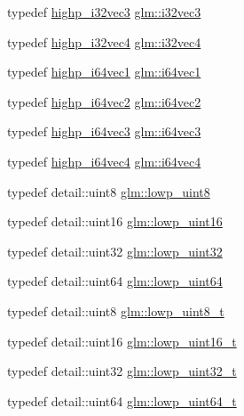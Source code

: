 \begin{DoxyCompactItemize}
\item 
typedef \hyperlink{fwd_8hpp_aabf16742eb3f9d1402d831e182404e86}{highp\+\_\+i32vec3} \hyperlink{group__gtc__type__precision_ga9811a4ec26e517ea85c785d3f3f4baac}{glm\+::i32vec3}
\item 
typedef \hyperlink{fwd_8hpp_abeb160cb5610f11a3fa0edd5733ae234}{highp\+\_\+i32vec4} \hyperlink{group__gtc__type__precision_ga78c16dde5527264e8085b375efba6f28}{glm\+::i32vec4}
\item 
typedef \hyperlink{fwd_8hpp_a07dad21304dad86950b7a3d7c0d58139}{highp\+\_\+i64vec1} \hyperlink{group__gtc__type__precision_gad2bbfb4ed2d4b1e1551c721f81739e49}{glm\+::i64vec1}
\item 
typedef \hyperlink{fwd_8hpp_a94b4a9359fe8ab31ad2ed08722bd4817}{highp\+\_\+i64vec2} \hyperlink{group__gtc__type__precision_ga8654a1b3a6f81677f53eec13f8dd4224}{glm\+::i64vec2}
\item 
typedef \hyperlink{fwd_8hpp_a1ed735dc8ceb4cd975466a153f483329}{highp\+\_\+i64vec3} \hyperlink{group__gtc__type__precision_gad7aa290b2d88847999c1305ed5c82669}{glm\+::i64vec3}
\item 
typedef \hyperlink{fwd_8hpp_a46d8425fd276eff0b202bd07f8f47362}{highp\+\_\+i64vec4} \hyperlink{group__gtc__type__precision_ga77db970d924dd55ac93e00391ad4a10e}{glm\+::i64vec4}
\item 
typedef detail\+::uint8 \hyperlink{group__gtc__type__precision_ga4d9dc08b7b248a386dfe9afd00fc6b1e}{glm\+::lowp\+\_\+uint8}
\item 
typedef detail\+::uint16 \hyperlink{group__gtc__type__precision_ga9b8409887319f62f06e664f6ca121b9d}{glm\+::lowp\+\_\+uint16}
\item 
typedef detail\+::uint32 \hyperlink{group__gtc__type__precision_gaf11e85af414720b4cd12bd57b3a81e68}{glm\+::lowp\+\_\+uint32}
\item 
typedef detail\+::uint64 \hyperlink{group__gtc__type__precision_gacf666a9d9b309c4615c7a4f2ab0be289}{glm\+::lowp\+\_\+uint64}
\item 
typedef detail\+::uint8 \hyperlink{group__gtc__type__precision_ga0910ef24195d1b8b26e34d73148c0c45}{glm\+::lowp\+\_\+uint8\+\_\+t}
\item 
typedef detail\+::uint16 \hyperlink{group__gtc__type__precision_ga9a71176a4e5bc61951f9e9197d9c80e1}{glm\+::lowp\+\_\+uint16\+\_\+t}
\item 
typedef detail\+::uint32 \hyperlink{group__gtc__type__precision_ga9f8cb602a358e1f48bda2682cf051f0c}{glm\+::lowp\+\_\+uint32\+\_\+t}
\item 
typedef detail\+::uint64 \hyperlink{group__gtc__type__precision_gabf3069d4f188557a87b1d7f35eb0a270}{glm\+::lowp\+\_\+uint64\+\_\+t}

\end{DoxyCompactItemize}
